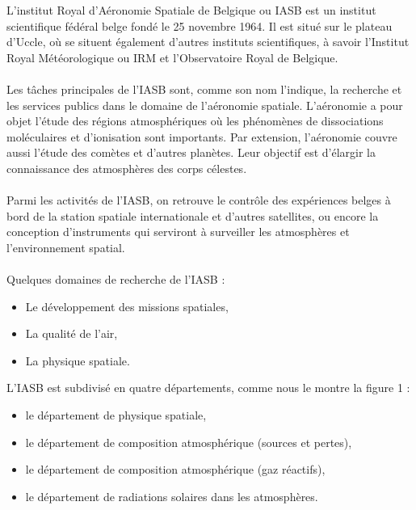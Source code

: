 \documentclass[11pt]{article}
\begin{document}
L'institut Royal d'Aéronomie Spatiale de Belgique ou IASB est un institut scientifique fédéral belge fondé le 25 novembre 1964.
Il est situé sur le plateau d'Uccle, où se situent également d'autres instituts scientifiques, à savoir l'Institut Royal Météorologique ou IRM et l'Observatoire Royal de Belgique.\\
\\
Les tâches principales de l'IASB sont, comme son nom l'indique, la recherche et les services publics dans le domaine de l'aéronomie spatiale.
L'aéronomie a pour objet l'étude des régions atmosphériques où les phénomènes de dissociations moléculaires et d'ionisation sont importants.
Par extension, l'aéronomie couvre aussi l'étude des comètes et d'autres planètes.
Leur objectif est d'élargir la connaissance des atmosphères des corps célestes.\\
\\
Parmi les activités de l'IASB, on retrouve le contrôle des expériences belges à bord de la station spatiale internationale et d'autres satellites, ou encore la conception d'instruments qui serviront à surveiller les atmosphères et l'environnement spatial.\\
\\
Quelques domaines de recherche de l'IASB :
\begin{itemize}[noitemsep]
    \item Le développement des missions spatiales,
    \item La qualité de l'air,
    \item La physique spatiale.
\end{itemize}
\vspace{10pt}
L'IASB est subdivisé en quatre départements, comme nous le montre la figure 1 :
\begin{itemize}[noitemsep]
    \item le département de physique spatiale,
    \item le département de composition atmosphérique (sources et pertes),
    \item le département de composition atmosphérique (gaz réactifs),
    \item le département de radiations solaires dans les atmosphères.
\end{itemize}
\vspace{3pt}
\end{document}
